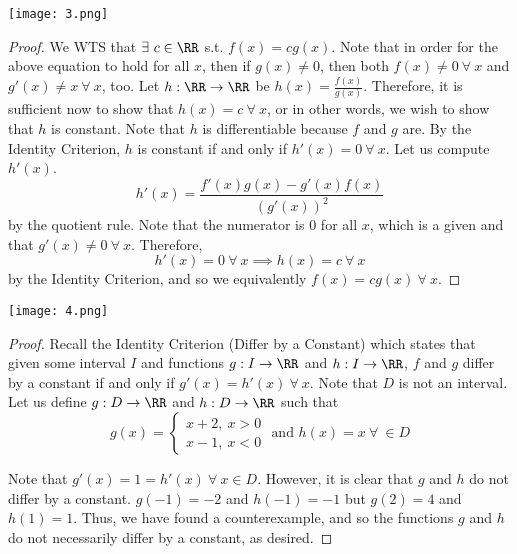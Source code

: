 \documentclass[12pt]{scrartcl}
\begin{document}
\newpage 

\texttt{[image: 3.png]}

\begin{proof}
  
\hfill

We WTS that $\exists \ c \in \RR$ s.t. $f(x) = cg(x)$. 
Note that in order for the above equation to hold for all $x$, then if $g(x) \neq 0$, then 
both $f(x) \neq 0 \ \forall \ x$ and $g'(x) \neq x \ \forall \ x$, too.
Let $h: \RR \to \RR$ be $h(x) = \frac{f(x)}{g(x)}$. Therefore, it is sufficient now 
to show that $h(x) = c \ \forall \ x$, or in other words, we wish to show that 
$h$ is constant.
Note that $h$ is differentiable 
because $f$ and $g$ are. By the Identity Criterion, $h$ is constant if and only if $h'(x) = 0 \ \forall \ x$. 
Let us compute $h'(x)$.
\[h'(x) = \frac{f'(x)g(x) - g'(x)f(x)}{(g'(x))^2}\]
by the quotient rule. Note that the numerator is $0$ for all $x$, which is a given and that 
$g'(x) \neq 0 \ \forall \ x$. Therefore, 
\[h'(x) = 0 \ \forall \ x \implies h(x) = c \ \forall \ x\]
by the Identity Criterion, and so we equivalently $f(x) = cg(x) \ \forall \ x$. 

\end{proof}

\newpage 

\texttt{[image: 4.png]}

\begin{proof}
  
\hfill

Recall the Identity Criterion (Differ by a Constant) which states that given some interval 
$I$ and functions $g: I \to \RR$ and $h: I \to \RR$, $f$ and $g$ differ by a constant 
if and only if $g'(x) = h'(x) \ \forall \ x$. Note that $D$ is not an interval. Let 
us define $g: D \to \RR$ and $h: D \to \RR$ such that  
\[g(x) = \begin{cases}
  x + 2, \ x > 0\\
  x - 1, \ x < 0
\end{cases} \text{ and  } h(x) = x \ \forall \ \in D\]

Note that $g'(x) = 1 = h'(x) \ \forall \ x \in D$. However, it is clear that $g$ and $h$ 
do not differ by a constant. $g(-1) = -2$ and $h(-1) = -1$ but 
$g(2) = 4$ and $h(1) = 1$. Thus, we have found a counterexample, and so the functions 
$g$ and $h$ do not necessarily differ by a constant, as desired.

\end{proof}
\end{document}
